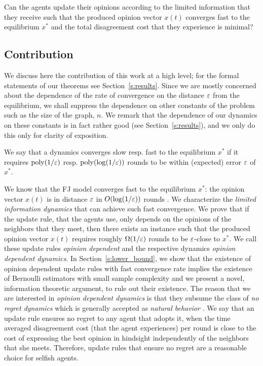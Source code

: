 \begin{question}\label{q:motivation2}
  Can the agents update their opinions according to the limited information
  that they receive such that the produced opinion vector $x(t)$ converges fast
  to the equilibrium $x^*$ and the total disagreement cost that they experience
  is minimal?
\end{question}

\subsection{Contribution} We discuss here the contribution of this work at a
high level; for the formal statements of our theorems see
Section~\ref{s:results}.  Since we are mostly concerned about the dependence of
the rate of convergence on the distance $\varepsilon$ from the equilibrium, we shall
suppress the dependence on other constants of the problem such as the size of
the graph, $n$.  We remark that the dependence of our dynamics on these
constants is in fact rather good (see Section~\ref{s:results}), and we only do
this only for clarity of exposition.

\begin{definition}[Informal]\label{d:convergence_rate}
  We say that a dynamics converges slow resp. fast to the equilibrium $x^*$ if
  it requires $\mathrm{poly}(1/\varepsilon)$ resp. $\mathrm{poly}(\log(1/\varepsilon))$ rounds to
  be within (expected) error $\varepsilon$ of $x^*$.
\end{definition}

We know that the FJ model converges fast to the equilibrium $x^*$: the opinion
vector $x(t)$ is in distance $\varepsilon$ in $O(\log (1/\varepsilon))$ rounds \cite{GS14}.
We characterize the \emph{limited information dynamics} that can achieve such
fast convergence.  We prove that if the update rule, that the agents use, only
depends on the opinions of the neighbors that they meet, then there exists an
instance such that the produced opinion vector $x(t)$ requires roughly
$\Omega(1/\varepsilon)$ rounds to be $\varepsilon$-close to $x^*$. We call these update rules
\emph{opinion dependent} and the respective dynamics \emph{opinion dependent
  dynamics}.  In Section~\ref{s:lower_bound}, we show that the existence of
opinion dependent update rules with fast convergence rate implies the existence
of Bernoulli estimators with small sample complexity and we present a novel,
information theoretic argument, to rule out their existence.  The reason that
we are interested in \emph{opinion dependent dynamics} is that they subsume the
class of \emph{no regret dynamics} which is generally accepted as \emph{natural
  behavior}  \cite{EMN09}.  We say that an update rule ensures no regret to any
agent that adopts it, when the time averaged disagreement cost (that the agent
experiences) per round is close to the cost of expressing the best opinion in
hindsight independently of the neighbors that she meets. Therefore, update
rules that ensure no regret are a reasonable choice for selfish agents.

